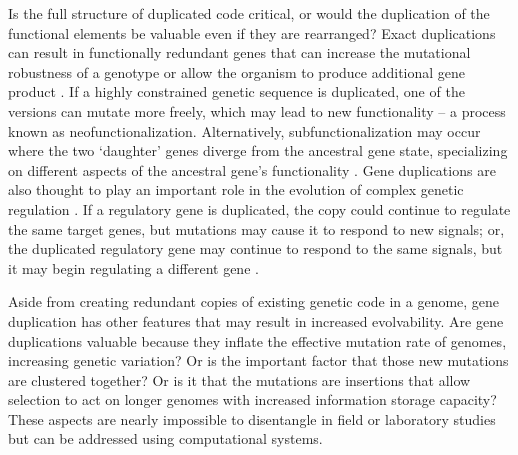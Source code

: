 Is the full structure of duplicated code critical, or would the duplication of the functional elements be valuable even if they are rearranged? Exact duplications can result in functionally redundant genes that can increase the mutational robustness of a genotype \citep{Crow:2006role} or %
allow the organism to produce
additional gene product %
\citep{Zhang:2003fw}. If a highly constrained genetic sequence is duplicated, one of the versions can mutate more freely, which may lead to new functionality \citep{Zhang:2003fw,Wagner:2003fk} -- a process known as neofunctionalization. Alternatively, subfunctionalization may occur where the two `daughter' genes diverge from the ancestral gene state, specializing on different aspects of the ancestral gene's functionality
\citep{Zhang:2003fw}.
Gene duplications are also thought to play an important role in the evolution of complex genetic regulation \citep{Teichmann:2004cz}. If a regulatory gene is duplicated, the copy could continue to regulate the same target genes, but mutations may cause it to respond to new signals; or, the duplicated regulatory gene may continue to respond to the same signals, but it may begin regulating a different gene \citep{Teichmann:2004cz}.

Aside from creating redundant copies of existing genetic code in a genome, gene duplication has other features that may result in increased evolvability.
Are gene duplications valuable because they inflate the effective mutation rate of genomes, increasing genetic variation?
Or is the important factor that those new mutations are clustered together?
Or is it that the mutations are insertions that allow selection to act on longer genomes with increased information storage capacity?
These aspects are nearly impossible to disentangle in field or laboratory studies but can be addressed using computational systems.

